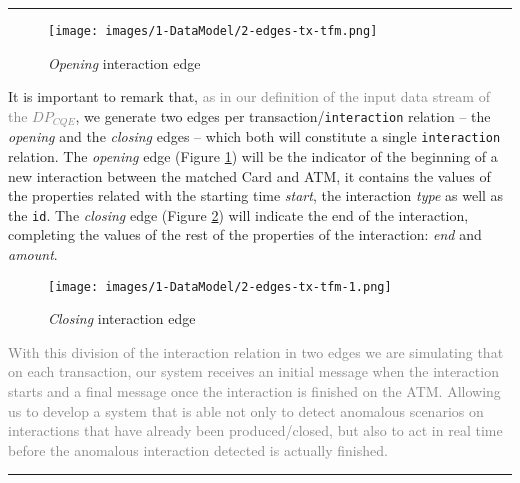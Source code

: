 \textcolor{red}{\rule{\linewidth}{0.5mm}}

\begin{figure}[h]
  \centering
  \texttt{[image: images/1-DataModel/2-edges-tx-tfm.png]}
  \caption{\emph{Opening} interaction edge}
  \label{img:opening-edge}
\end{figure}

It is important to remark that, \textcolor{gray}{as in our definition of the input data stream of the $DP_{CQE}$}, we generate two edges per transaction/\texttt{interaction} relation -- the \emph{opening} and the \emph{closing} edges -- which both will constitute a single \texttt{interaction} relation. The \emph{opening} edge (Figure \ref{img:opening-edge}) will be the indicator of the beginning of a new interaction between the matched Card and ATM, it contains the values of the properties related with the starting time \emph{start}, the interaction \emph{type} as well as the \texttt{id}. The \emph{closing} edge (Figure \ref{img:closing-edge}) will indicate the end of the interaction, completing the values of the rest of the properties of the interaction: \emph{end} and \emph{amount}.

\begin{figure}[h]
  \centering
  \texttt{[image: images/1-DataModel/2-edges-tx-tfm-1.png]}
  \caption{\emph{Closing} interaction edge}
  \label{img:closing-edge}
\end{figure}

\textcolor{gray}{With this division of the interaction relation in two edges we are simulating that on each transaction, our system receives an initial message when the interaction starts and a final message once the interaction is finished on the ATM. Allowing us to develop a system that is able not only to detect anomalous scenarios on interactions that have already been produced/closed, but also to act in real time before the anomalous interaction detected is actually finished.}

\textcolor{red}{\rule{\linewidth}{0.5mm}}

